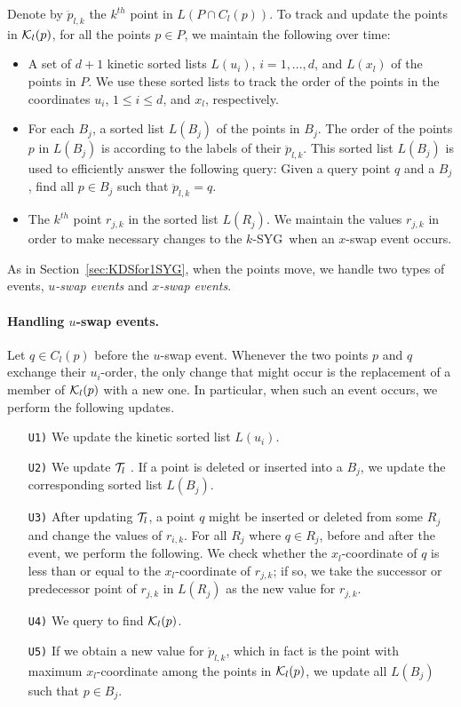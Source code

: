 \documentclass[preprint,12pt]{elsarticle}
\def\ksyg{\mbox{$k$-SYG}}
\begin{document}
Denote by $\ddot{p}_{l,k}$ the $k^{th}$ point in $L(P\cap C_l(p))$.  To track and update the points in ${\cal K}_l(p)$, for all the points $p\in P$, we maintain the following over time:

\begin{itemize}
\item A set of $d+1$ kinetic sorted lists $L(u_i)$, $i=1,...,d$, and $L(x_l)$ of the points in $P$. We use these sorted lists to track the order of the points in the coordinates $u_i$, $1\leq i\leq d$, and $x_l$, respectively.
\item For each $B_j$, a sorted list $L(B_j)$ of the points in $B_j$. The order of the points $p$ in $L(B_j)$ is according to the labels of their $\ddot{p}_{l,k}$. This sorted list $L(B_j)$ is used to efficiently answer the following query: Given a query point $q$ and a $B_j$, find all $p\in B_j$ such that $\ddot{p}_{l,k}=q$.
\item The $k^{th}$ point $r_{j,k}$ in the sorted list $L(R_j)$. We maintain the values $r_{j,k}$ in order to make necessary changes to the \ksyg~when an $x$-swap event occurs.
\end{itemize}

As in Section~\ref{sec:KDSfor1SYG}, when the points move, we handle two types of events, \textit{$u$-swap events} and \textit{$x$-swap events}.

\paragraph{Handling $u$-swap events.}
Let $q\in C_l(p)$ before the $u$-swap event. Whenever the two points $p$ and $q$ exchange their $u_i$-order, the only change that might occur is the replacement of a member of ${\cal K}_l(p)$ with a new one. In particular, when such an event occurs, we perform the following updates.

\begin{enumerate}
\item[\texttt{U1)}] We update the kinetic sorted list $L(u_i)$.
\item[\texttt{U2)}] We update ${\cal T}_l$ . If a point is deleted or inserted into a $B_j$, we update the corresponding sorted list $L(B_j)$.
\item[\texttt{U3)}] After updating ${\cal T}_l$, a point $q$ might be inserted or deleted from some $R_j$ and change the values of $r_{i,k}$. For all $R_j$ where $q\in R_j$, before and after the event, we perform the following. We check whether the $x_l$-coordinate of  $q$ is less than or equal to the $x_l$-coordinate of $r_{j,k}$; if so, we take the successor or predecessor point of $r_{j,k}$ in $L(R_j)$ as the new value for $r_{j,k}$.
\item[\texttt{U4)}] We query to find ${\cal K}_l(p)$.
\item[\texttt{U5)}] If we obtain a new value for $\ddot{p}_{l,k}$, which in fact is the point with maximum $x_l$-coordinate among the points in ${\cal K}_l(p)$, we update all $L(B_j)$ such that $p\in B_j$.
\end{enumerate}
\end{document}
